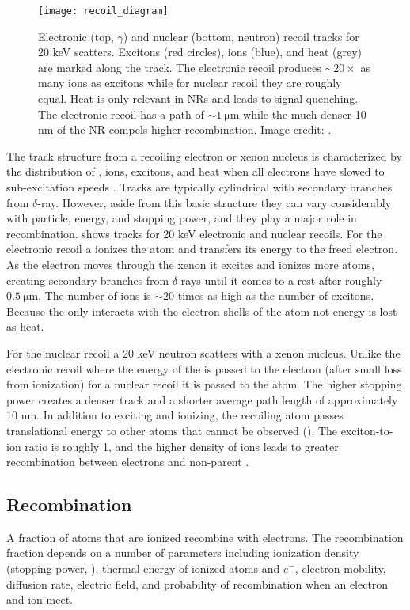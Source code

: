 \begin{figure}
\centering
\texttt{[image: recoil\_diagram]}
\caption{Electronic (top, $\gamma$) and nuclear (bottom, neutron) recoil tracks for 20 keV scatters.  Excitons (red circles), ions
(blue), and
heat (grey) are marked along the track.  The electronic recoil produces ${\sim} 20 \times$ as many ions as excitons while for nuclear
recoil they are roughly equal.  Heat is only relevant in NRs and leads to signal quenching.  The electronic recoil has a path of
${\sim} 1\ \mathrm{\mu m}$ while the much denser 10 nm of the NR compels higher recombination.  Image credit: .}
\label{fig:er_nr_recoil_diagram}
\end{figure}

The track structure from a recoiling electron or xenon nucleus is characterized by the distribution of \electron, ions, excitons, and heat
when all electrons have slowed to sub-excitation speeds .  Tracks are typically cylindrical with secondary branches
from $\delta$-ray.  However, aside from this basic structure they can vary considerably with particle, energy, and
stopping power, and they play a major role in recombination.   shows tracks for 20 keV electronic and
nuclear
recoils.  For the electronic recoil a \gammaray ionizes the atom and transfers its energy to the freed electron.  As the electron moves
through the xenon it excites and ionizes more atoms, creating secondary branches from $\delta$-rays until it comes to a rest after
roughly $0.5\ \mathrm{\mu m}$.  The number of ions is ${\sim}20$ times as high as the number of excitons.  Because the \electron only
interacts with the electron shells of the atom not energy is lost as heat.

For the nuclear recoil a 20 keV neutron scatters with a xenon nucleus.  Unlike the electronic recoil where the energy of the \gammaray is
passed to the electron (after small loss from ionization) for a nuclear recoil it is passed to the atom.  The higher stopping power
creates a denser track and a shorter average path length of approximately 10 nm.  In addition to exciting and ionizing, the recoiling atom
passes translational energy to other atoms that cannot be observed ().  The exciton-to-ion ratio is roughly
1, and the higher density of ions leads to greater recombination between electrons and non-parent .


\subsection{Recombination}
\label{subsec:recombination}
A fraction of atoms that are ionized recombine with electrons.  The recombination fraction depends on a number of parameters
including ionization density
(stopping power, ), thermal energy of ionized atoms and $e^{-}$, electron mobility, diffusion rate, electric
field, and probability of recombination when an electron and ion meet.

